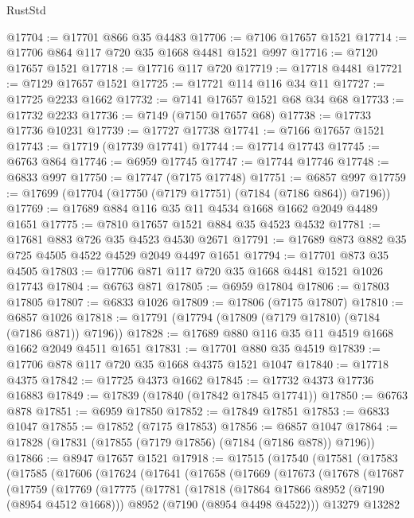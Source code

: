 \begin{lexlean}{RustStd}
\begin{coremodule}
@17704 := @17701 @866 @35 @4483
@17706 := @7106 @17657 @1521
@17714 := @17706 @864 @117 @720 @35 @1668 @4481 @1521 @997
@17716 := @7120 @17657 @1521
@17718 := @17716 @117 @720
@17719 := @17718 @4481
@17721 := @7129 @17657 @1521
@17725 := @17721 @114 @116 @34 @11
@17727 := @17725 @2233 @1662
@17732 := @7141 @17657 @1521 @68 @34 @68
@17733 := @17732 @2233
@17736 := @7149 (@7150 @17657 @68)
@17738 := @17733 @17736 @10231
@17739 := @17727 @17738
@17741 := @7166 @17657 @1521
@17743 := @17719 (@17739 @17741)
@17744 := @17714 @17743
@17745 := @6763 @864
@17746 := @6959 @17745
@17747 := @17744 @17746
@17748 := @6833 @997
@17750 := @17747 (@7175 @17748)
@17751 := @6857 @997
@17759 := @17699 (@17704 (@17750 (@7179 @17751) (@7184 (@7186 @864)) @7196))
@17769 := @17689 @884 @116 @35 @11 @4534 @1668 @1662 @2049 @4489 @1651
@17775 := @7810 @17657 @1521 @884 @35 @4523 @4532
@17781 := @17681 @883 @726 @35 @4523 @4530 @2671
@17791 := @17689 @873 @882 @35 @725 @4505 @4522 @4529 @2049 @4497 @1651
@17794 := @17701 @873 @35 @4505
@17803 := @17706 @871 @117 @720 @35 @1668 @4481 @1521 @1026 @17743
@17804 := @6763 @871
@17805 := @6959 @17804
@17806 := @17803 @17805
@17807 := @6833 @1026
@17809 := @17806 (@7175 @17807)
@17810 := @6857 @1026
@17818 := @17791 (@17794 (@17809 (@7179 @17810) (@7184 (@7186 @871)) @7196))
@17828 := @17689 @880 @116 @35 @11 @4519 @1668 @1662 @2049 @4511 @1651
@17831 := @17701 @880 @35 @4519
@17839 := @17706 @878 @117 @720 @35 @1668 @4375 @1521 @1047
@17840 := @17718 @4375
@17842 := @17725 @4373 @1662
@17845 := @17732 @4373 @17736 @16883
@17849 := @17839 (@17840 (@17842 @17845 @17741))
@17850 := @6763 @878
@17851 := @6959 @17850
@17852 := @17849 @17851
@17853 := @6833 @1047
@17855 := @17852 (@7175 @17853)
@17856 := @6857 @1047
@17864 := @17828 (@17831 (@17855 (@7179 @17856) (@7184 (@7186 @878)) @7196))
@17866 := @8947 @17657 @1521
@17918 := @17515
    (@17540
      (@17581
        (@17583
          (@17585
            (@17606
              (@17624
                (@17641
                  (@17658
                    (@17669
                      (@17673
                        (@17678
                          (@17687
                            (@17759
                              (@17769
                                (@17775
                                  (@17781
                                    (@17818
                                      (@17864 @17866 @8952 (@7190 (@8954 @4512 @1668)))
                                      @8952
                                      (@7190 (@8954 @4498 @4522)))
                                    @13279
                                    @13282

\end{coremodule}
\end{lexlean}
